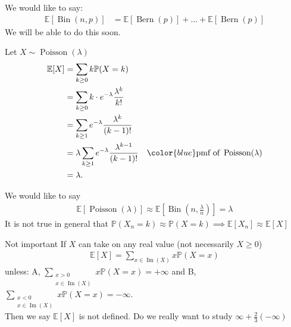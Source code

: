 \begin{note}
    We would like to say:
    \begin{align*}
        \mathbb{E}[\operatorname{Bin}(n, p)] &= \mathbb{E}[\operatorname{Bern}(p)] + \dots + \mathbb{E}[\operatorname{Bern}(p)]
    \end{align*} 
    We will be able to do this soon.
\end{note} 

\begin{example}
    Let $X \sim \operatorname{Poisson}(\lambda)$
    \begin{align*}
        \mathbb{E}[X] &= \sum_{k \geq 0} k \mathbb{P}(X = k) \\
        &= \sum_{k \geq 0} k \cdot e^{-\lambda} \frac{\lambda^k}{k!} \\
        &= \sum_{k \geq 1} e^{-\lambda} \frac{\lambda^k}{(k - 1)!} \\
        &= \lambda \sum_{k \geq 1} e^{-\lambda} \frac{\lambda^{k - 1}}{(k - 1)!} \quad \color{blue} \text{pmf of } \operatorname{Poisson}(\lambda) \\
        &= \lambda.
    \end{align*} 
\end{example} 

\begin{note}
    We would like to say
    \begin{align*}
        \mathbb{E}[\operatorname{Poisson}(\lambda)] \approx \mathbb{E}\left[\operatorname{Bin}\left(n, \frac{\lambda}{n}\right)\right] = \lambda
    \end{align*} 
    \color{blue} It is not true in general that $\mathbb{P}(X_n = k) \approx \mathbb{P}(X = k) \implies \mathbb{E}[X_n] \approx \mathbb{E}[X]$
\end{note} 

\begin{aside}{Not important}
    If $X$ can take on any real value (not necessarily $X \geq 0$)
    \begin{align*}
        \mathbb{E}[X] = \sum_{x \in \operatorname{Im}(X)} x \mathbb{P}(X = x)
    \end{align*} 
    unless: A, $\displaystyle \sum_{\substack{x > 0 \\ x \in \operatorname{Im}(X)}} x \mathbb{P}(X = x) = + \infty$ and B, $\displaystyle \sum_{\substack{x < 0 \\ x \in \operatorname{Im}(X)}} x \mathbb{P}(X = x) = - \infty$. \\
    Then we say $\mathbb{E}[X]$ is not defined.
    \color{red} Do we really want to study $\infty + \frac{2}{3} (- \infty)$ \color{black}
\end{aside} 

